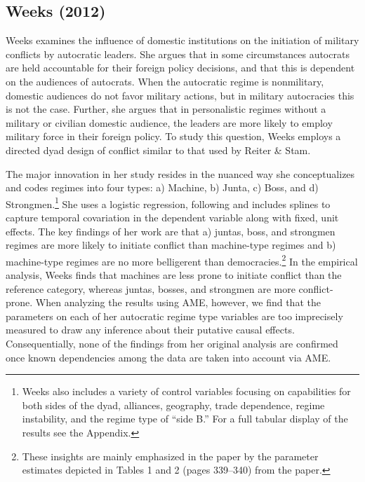 \subsection{Weeks (2012)}

\nocite{weeks:2012} Weeks examines the influence of domestic institutions on the initiation of military conflicts by autocratic leaders. She argues that in some circumstances autocrats are held accountable for their foreign policy decisions, and that this is dependent on the audiences of autocrats. When the autocratic regime is nonmilitary, domestic audiences do not favor military actions, but in military autocracies this is not the case. Further, she argues that in personalistic regimes without a military or civilian domestic audience, the leaders are more likely to employ military force in their foreign policy. To study this question, Weeks employs a directed dyad design of conflict similar to that used by Reiter \& Stam.

The major innovation in her study resides in the nuanced way she conceptualizes and codes regimes into four types: a) Machine, b) Junta, c) Boss, and d) Strongmen.\footnote{Weeks also includes a variety of control variables focusing on capabilities for both sides of the dyad, alliances, geography, trade dependence, regime instability, and the regime type of ``side B.'' For a full tabular display of the results see the Appendix.} She uses a logistic regression, following \citet{beck:etal:1998} and includes splines to capture temporal covariation in the dependent variable along with fixed, unit effects. The key findings of her work are that a) juntas, boss, and strongmen regimes are more likely to initiate conflict than machine-type regimes and b) machine-type regimes are no more belligerent than democracies.\footnote{These insights are mainly emphasized in the paper by the parameter estimates depicted in Tables 1 and 2 (pages 339--340) from the paper.} In the empirical analysis, Weeks finds that machines are less prone to initiate conflict than the reference category, whereas juntas, bosses, and strongmen are more conflict-prone. When analyzing the results using AME, however, we find that the parameters on each of her autocratic regime type variables are too imprecisely measured to draw any inference about their putative causal effects. Consequentially, none of the findings from her original analysis are confirmed once known dependencies among the data are taken into account via AME. 

